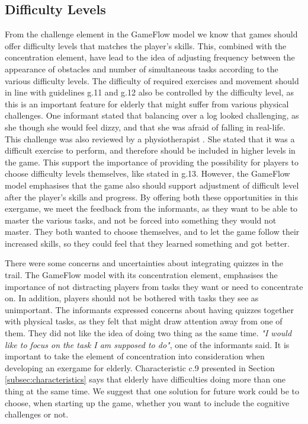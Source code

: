 \subsection{Difficulty Levels}

From the challenge element in the GameFlow model we know that games should offer difficulty levels that matches the player's skills. This, combined with the concentration element, have lead to the idea of adjusting frequency between the appearance of obstacles and number of simultaneous tasks according to the various difficulty levels. The difficulty of required exercises and movement should in line with guidelines g.11 and g.12 also be controlled by the difficulty level, as this is an important feature for elderly that might suffer from various physical challenges. One informant stated that balancing over a log looked challenging, as she though she would feel dizzy, and that she was afraid of falling in real-life. This challenge was also reviewed by a physiotherapist . She stated that it was a difficult exercise to perform, and therefore should be included in higher levels in the game. This support the importance of providing the possibility for players to choose difficulty levels themselves, like stated in g.13. However, the GameFlow model emphasises that the game also should support adjustment of difficult level after the player's skills and progress. By offering both these opportunities in this exergame, we meet the feedback from the informants, as they want to be able to master the various tasks, and not be forced into something they would not master. They both wanted to choose themselves, and to let the game follow their increased skills, so they could feel that they learned something and got better. 

There were some concerns and uncertainties about integrating quizzes in the trail. The GameFlow model with its concentration element, emphasises the importance of not distracting players from tasks they want or need to concentrate on. In addition, players should not be bothered with tasks they see as unimportant. The informants expressed concerns about having quizzes together with physical tasks, as they felt that might draw attention away from one of them. They did not like the idea of doing two thing as the same time. \emph{"I would like to focus on the task I am supposed to do"}, one of the informants said. It is important to take the element of concentration into consideration when developing an exergame for elderly. Characteristic c.9 presented in Section \ref{subsec:characteristics} says that elderly have difficulties doing more than one thing at the same time. We suggest that one solution for future work could be to choose, when starting up the game, whether you want to include the cognitive challenges or not. 

